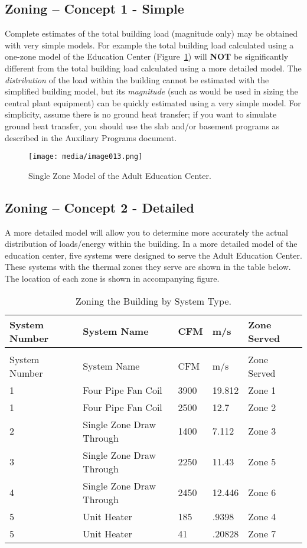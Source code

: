 \subsection{Zoning -- Concept 1 - Simple}\label{zoning-concept-1---simple}

Complete estimates of the total building load (magnitude only) may be obtained with very simple models. For example the total building load calculated using a one-zone model of the Education Center (Figure~\ref{fig:single-zone-model-of-the-adult-education}) will \textbf{NOT} be significantly different from the total building load calculated using a more detailed model. The \emph{distribution} of the load within the building cannot be estimated with the simplified building model, but its \emph{magnitude} (such as would be used in sizing the central plant equipment) can be quickly estimated using a very simple model. For simplicity, assume there is no ground heat transfer; if you want to simulate ground heat transfer, you should use the slab and/or basement programs as described in the Auxiliary Programs document.

\begin{figure}[hbtp] %
\centering
\texttt{[image: media/image013.png]}
\caption{Single Zone Model of the Adult Education Center. \protect \label{fig:single-zone-model-of-the-adult-education}}
\end{figure}

\subsection{Zoning -- Concept 2 - Detailed}\label{zoning-concept-2---detailed}

A more detailed model will allow you to determine more accurately the actual distribution of loads/energy within the building. In a more detailed model of the education center, five systems were designed to serve the Adult Education Center. These systems with the thermal zones they serve are shown in the table below. The location of each zone is shown in accompanying figure.

\begin{longtable}[c]{@{}lllll@{}}
\caption{Zoning the Building by System Type. \label{table:zoning-the-building-by-system-type.}} \tabularnewline
\toprule 
System Number & System Name & CFM & m/s & Zone Served \tabularnewline
\midrule
\endfirsthead

\caption[]{Zoning the Building by System Type.} \tabularnewline
\toprule 
System Number & System Name & CFM & m/s & Zone Served \tabularnewline
\midrule
\endhead

1 & Four Pipe Fan Coil & 3900 & 19.812 & Zone 1 \tabularnewline
1 & Four Pipe Fan Coil & 2500 & 12.7 & Zone 2 \tabularnewline
2 & Single Zone Draw Through & 1400 & 7.112 & Zone 3 \tabularnewline
3 & Single Zone Draw Through & 2250 & 11.43 & Zone 5 \tabularnewline
4 & Single Zone Draw Through & 2450 & 12.446 & Zone 6 \tabularnewline
5 & Unit Heater & 185 & .9398 & Zone 4 \tabularnewline
5 & Unit Heater & 41 & .20828 & Zone 7 \tabularnewline
\bottomrule
\end{longtable}

